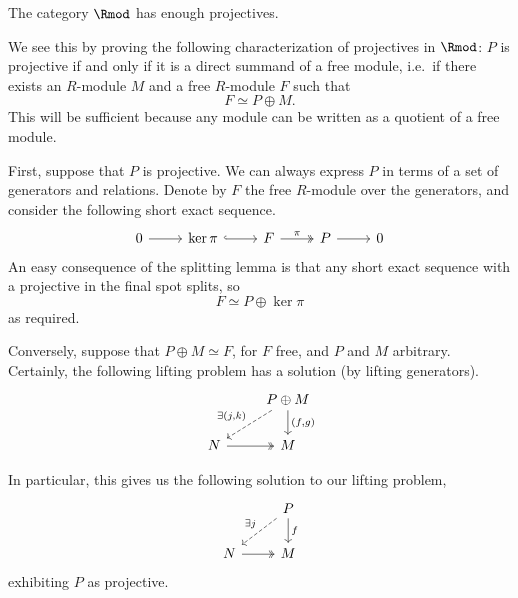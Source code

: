 \documentclass[main.tex]{subfiles}
\begin{document}
\begin{proposition}
  \label{prop:projectives_are_direct_summands_of_free}
  The category $\Rmod$ has enough projectives.

  We see this by proving the following characterization of projectives in $\Rmod$: $P$ is projective if and only if it is a direct summand of a free module, i.e.\ if there exists an $R$-module $M$ and a free $R$-module $F$ such that
  \begin{equation*}
    F \simeq P \oplus M.
  \end{equation*}
  This will be sufficient because any module can be written as a quotient of a free module.

  First, suppose that $P$ is projective. We can always express $P$ in terms of a set of generators and relations. Denote by $F$ the free $R$-module over the generators, and consider the following short exact sequence.
  \begin{equation*}
    \begin{tikzcd}
      0
      \arrow[r]
      & \ker \pi
      \arrow[r, hookrightarrow]
      & F
      \arrow[r, twoheadrightarrow, "\pi"]
      & P
      \arrow[r]
      & 0
    \end{tikzcd}
  \end{equation*}
  An easy consequence of the splitting lemma is that any short exact sequence with a projective in the final spot splits, so
  \begin{equation*}
    F \simeq P \oplus \ker \pi
  \end{equation*}
  as required.

  Conversely, suppose that $P \oplus M \simeq F$, for $F$ free, and $P$ and $M$ arbitrary. Certainly, the following lifting problem has a solution (by lifting generators).
  \begin{equation*}
    \begin{tikzcd}
      & P \oplus M
      \arrow[d, "{(f, g)}"]
      \arrow[dl, dashed, swap, "\exists {(j, k)}"]
      \\
      N
      \arrow[r, twoheadrightarrow]
      & M
    \end{tikzcd}
  \end{equation*}

  In particular, this gives us the following solution to our lifting problem,
  \begin{equation*}
    \begin{tikzcd}
      & P
      \arrow[d, "f"]
      \arrow[dl, dashed, swap, "\exists j"]
      \\
      N
      \arrow[r, twoheadrightarrow]
      & M
    \end{tikzcd}
  \end{equation*}
  exhibiting $P$ as projective.
\end{proposition}
\end{document}
